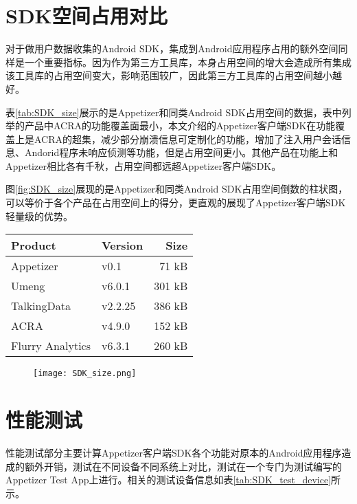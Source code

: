 \section{SDK空间占用对比}
\label{sec:SDK_size_compare}

对于做用户数据收集的Android SDK，集成到Android应用程序占用的额外空间同样是一个重要指标。因为作为第三方工具库，本身占用空间的增大会造成所有集成该工具库的占用空间变大，影响范围较广，因此第三方工具库的占用空间越小越好。

表\ref{tab:SDK_size}展示的是Appetizer和同类Android SDK占用空间的数据，表中列举的产品中ACRA的功能覆盖面最小，本文介绍的Appetizer客户端SDK在功能覆盖上是ACRA的超集，减少部分崩溃信息可定制化的功能，增加了注入用户会话信息、Andorid程序未响应侦测等功能，但是占用空间更小。其他产品在功能上和Appetizer相比各有千秋，占用空间都远超Appetizer客户端SDK。

图\ref{fig:SDK_size}展现的是Appetizer和同类Android SDK占用空间倒数的柱状图，可以等价于各个产品在占用空间上的得分，更直观的展现了Appetizer客户端SDK轻量级的优势。

\begin{table}[!hpb]
	\centering
	\begin{tabular}{@{}llr@{}} \toprule
		Product & Version &Size \\ \midrule
		Appetizer &v0.1& 71 kB \\
		Umeng&v6.0.1& 301 kB \\
		TalkingData&v2.2.25& 386 kB \\
		ACRA&v4.9.0& 152 kB \\
		Flurry Analytics&v6.3.1& 260 kB \\ \bottomrule
	\end{tabular}
\end{table}

\begin{figure}[!htp]
	\centering
	\texttt{[image: SDK\_size.png]}
\end{figure}

\section{性能测试}
\label{sec:perfor_test}

性能测试部分主要计算Appetizer客户端SDK各个功能对原本的Android应用程序造成的额外开销，测试在不同设备不同系统上对比，测试在一个专门为测试编写的Appetizer Test App上进行。相关的测试设备信息如表\ref{tab:SDK_test_device}所示。

